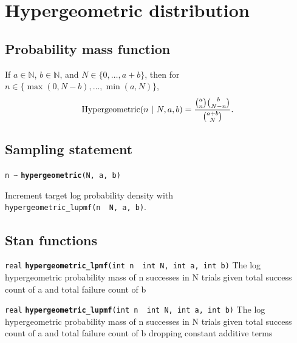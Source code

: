 \documentclass[
  10pt,
]{book}
\begin{document}
\hypertarget{hypergeometric-distribution}{%
\section{Hypergeometric distribution}\label{hypergeometric-distribution}}

\hypertarget{probability-mass-function-6}{%
\subsection{Probability mass function}\label{probability-mass-function-6}}

If \(a \in \mathbb{N}\), \(b \in \mathbb{N}\), and \(N \in \{0,\ldots,a+b\}\), then for \(n \in \{\max(0,N-b),\ldots,\min(a,N)\}\),
\[ \text{Hypergeometric}(n~|~N,a,b) = \frac{\normalsize{\binom{a}{n}
\binom{b}{N - n}}}      {\normalsize{\binom{a + b}{N}}}. \]

\hypertarget{sampling-statement-6}{%
\subsection{Sampling statement}\label{sampling-statement-6}}

\texttt{n\ \textasciitilde{}} \textbf{\texttt{hypergeometric}}\texttt{(N,\ a,\ b)}

Increment target log probability density with \texttt{hypergeometric\_lupmf(n\ \textbar{}\ N,\ a,\ b)}.

\hypertarget{stan-functions-6}{%
\subsection{Stan functions}\label{stan-functions-6}}


\texttt{real} \textbf{\texttt{hypergeometric\_lpmf}}\texttt{(int\ n\ \textbar{}\ int\ N,\ int\ a,\ int\ b)}\newline
The log hypergeometric probability mass of n successes in N trials
given total success count of a and total failure count of b


\texttt{real} \textbf{\texttt{hypergeometric\_lupmf}}\texttt{(int\ n\ \textbar{}\ int\ N,\ int\ a,\ int\ b)}\newline
The log hypergeometric probability mass of n successes in N trials
given total success count of a and total failure count of b dropping constant
additive terms
\end{document}
